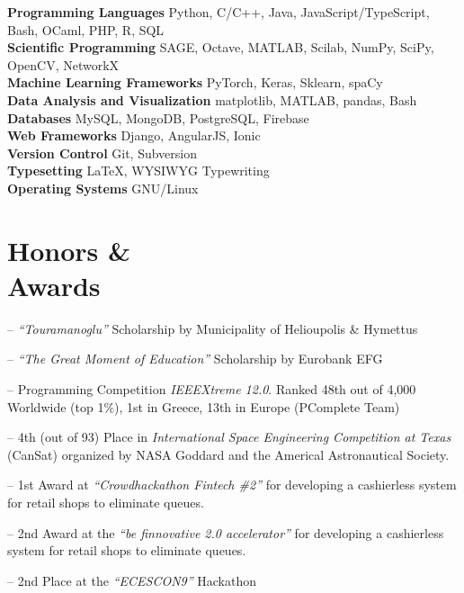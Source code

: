 \documentclass[margin]{res}
\newcommand{\field}[2]{\noindent \textbf{#1} \hfill #2 \\}
\begin{document}
\begin{resume}
\field{Programming Languages}  {Python, C/C++, Java, JavaScript/TypeScript, Bash, OCaml, PHP, R, SQL  } 
\field{Scientific Programming} {SAGE, Octave, MATLAB, Scilab, NumPy, SciPy, OpenCV, NetworkX } 
\field{Machine Learning Frameworks}  {PyTorch, Keras, Sklearn, spaCy } 
\field{Data Analysis and Visualization} {matplotlib, MATLAB, pandas, Bash } 
\field{Databases} {MySQL, MongoDB, PostgreSQL, Firebase}
\field{Web Frameworks} {Django, AngularJS, Ionic}
\field{Version Control} {Git, Subversion}
\field{Typesetting} {\LaTeX, WYSIWYG Typewriting}
\field{Operating Systems} {GNU/Linux}
\section{Honors \& \\ Awards} 
\begin{compactitem}
    \item [--] \emph{``Touramanoglu''} Scholarship by Municipality of Helioupolis \& Hymettus
    \item [--] \emph{``The Great Moment of Education''} Scholarship by Eurobank EFG 
\end{compactitem} 
\begin{compactitem}
    \item[--] Programming Competition \emph{IEEEXtreme 12.0}. Ranked 48th out of 4,000 Worldwide (top 1\%), 1st in Greece, 13th in Europe (PComplete Team)
    \item[--] 4th (out of 93) Place in \emph{International Space Engineering  Competition at Texas} (CanSat) organized by NASA Goddard and the Americal Astronautical Society.
    \item[--] 1st Award at \emph{``Crowdhackathon Fintech \#2''} for developing a cashierless system for retail shops to eliminate queues.
    \item[--] 2nd Award at the \emph{``be finnovative 2.0 accelerator''} for developing a cashierless system for retail shops to eliminate queues.
    \item[--] 2nd Place at the \emph{``ECESCON9''} Hackathon 
\end{compactitem}




\end{resume}
\end{document}

